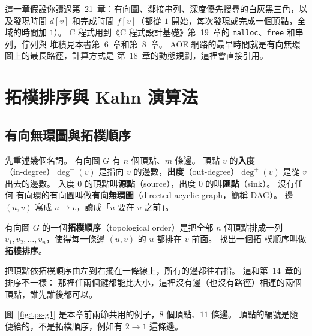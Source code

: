 這一章假設你讀過第~21~章：有向圖、鄰接串列、深度優先搜尋的白灰黑三色，以及發現時間
$d[v]$ 和完成時間 $f[v]$（都從 $1$ 開始，每次發現或完成一個頂點，全域的時間加 $1$）。
C 程式用到《C 程式設計基礎》第~19~章的 \texttt{malloc}、\texttt{free} 和串列，佇列與
堆積見本書第~6~章和第~8~章。 AOE 網路的最早時間就是有向無環圖上的最長路徑，計算方式是
第~18~章的動態規劃，這裡會直接引用。

\section{拓樸排序與 Kahn 演算法}
\label{sec:tps-kahn}

\subsection{有向無環圖與拓樸順序}

先重述幾個名詞。 有向圖 $G$ 有 $n$ 個頂點、$m$ 條邊。 頂點 $v$ 的\textbf{入度}
（in-degree）$\deg^{-}(v)$ 是指向 $v$ 的邊數，\textbf{出度}（out-degree）$\deg^{+}(v)$
是從 $v$ 出去的邊數。 入度 $0$ 的頂點叫\textbf{源點}（source），出度 $0$ 的叫\textbf{匯點}（sink）。 沒有任何
有向環的有向圖叫做\textbf{有向無環圖}（directed acyclic graph，簡稱 DAG）。 邊
$(u, v)$ 寫成 $u \to v$，讀成「$u$ 要在 $v$ 之前」。

\begin{definition}[拓樸順序]
\label{def:tps-order}
有向圖 $G$ 的一個\textbf{拓樸順序}（topological order）是把全部 $n$ 個頂點排成一列
$v_1, v_2, \ldots, v_n$，使得每一條邊 $(u, v)$ 的 $u$ 都排在 $v$ 前面。 找出一個拓
樸順序叫做\textbf{拓樸排序}。
\end{definition}

把頂點依拓樸順序由左到右擺在一條線上，所有的邊都往右指。 這和第~14~章的排序不一樣：
那裡任兩個鍵都能比大小，這裡沒有邊（也沒有路徑）相連的兩個頂點，誰先誰後都可以。

圖~\ref{fig:tps-g1} 是本章前兩節共用的例子，$8$ 個頂點、$11$ 條邊。 頂點的編號是隨
便給的，不是拓樸順序，例如有 $2 \to 1$ 這條邊。

